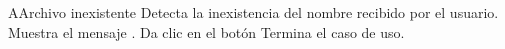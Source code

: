 
		
\begin{UCtrayectoriaA}{A}{Archivo inexistente}
	\UCpaso Detecta la inexistencia del nombre recibido por el usuario. 
	\UCpaso  Muestra el mensaje .	
	\UCpaso[\UCactor]  Da clic en el botón \IUbuttonAceptar
	\UCpaso Termina el caso de uso.
\end{UCtrayectoriaA}

